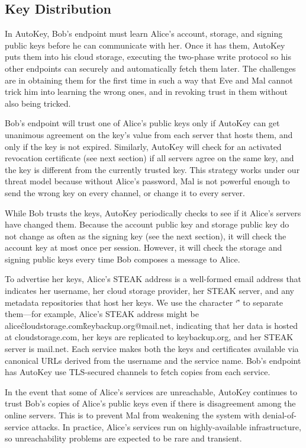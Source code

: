\subsection{Key Distribution}
In AutoKey, Bob’s endpoint must learn Alice's account, storage, and signing public keys before he can communicate with her.  Once it has them, AutoKey puts them into his cloud storage, executing the two-phase write protocol so his other endpoints can securely and automatically fetch them later.  The challenges are in obtaining them for the first time in such a way that Eve and Mal cannot trick him into learning the wrong ones, and in revoking trust in them without also being tricked.

Bob’s endpoint will trust one of Alice’s public keys only if AutoKey can get unanimous agreement on the key’s value from each server that hosts them, and only if the key is not expired.  Similarly, AutoKey will check for an activated revocation certificate (see next section) if all servers agree on the same key, and the key is different from the currently trusted key.  This strategy works under our threat model because without Alice’s password, Mal is not powerful enough to send the wrong key on every channel, or change it to every server.

While Bob trusts the keys, AutoKey periodically checks to see if it Alice’s servers have changed them.  Because the account public key and storage public key do not change as often as the signing key (see the next section), it will check the account key at most once per session.  However, it will check the storage and signing public keys every time Bob composes a message to Alice.

To advertise her keys, Alice’s STEAK address is a well-formed email address that indicates her username, her cloud storage provider, her STEAK server, and any metadata repositories that host her keys.  We use the character ‘\^’ to separate them---for example, Alice’s STEAK address might be alice\^cloudstorage.com\^keybackup.org@mail.net, indicating that her data is hosted at cloudstorage.com, her keys are replicated to keybackup.org, and her STEAK server is mail.net.  Each service makes both the keys and certificates available via canonical URLs derived from the username and the service name.  Bob’s endpoint has AutoKey use TLS-secured channels to fetch copies from each service.

In the event that some of Alice’s services are unreachable, AutoKey continues to trust Bob’s copies of Alice’s public keys even if there is disagreement among the online servers.  This is to prevent Mal from weakening the system with denial-of-service attacks.  In practice, Alice’s services run on highly-available infrastructure, so unreachability problems are expected to be rare and transient.

